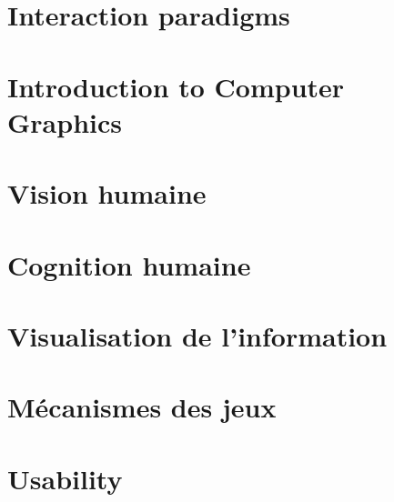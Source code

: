 \documentclass[a4paper,11pt]{article}
\theoremstyle{theorem-style}  %
\theoremstyle{definition-style}
\begin{document}
\section{Interaction paradigms}

\section{Introduction to Computer Graphics}

\section{Vision humaine}

\section{Cognition humaine}

\section{Visualisation de l'information}

\section{M\'ecanismes des jeux}

\section{Usability}

\end{document}
